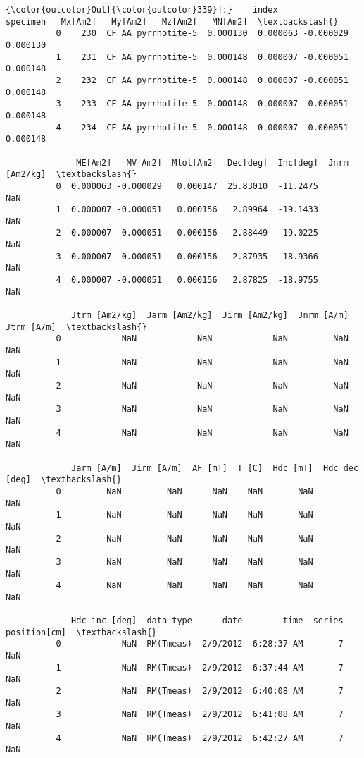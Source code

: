 \documentclass{article}
\begin{document}
            \begin{Verbatim}[commandchars=\\\{\}]
{\color{outcolor}Out[{\color{outcolor}339}]:}    index            specimen   Mx[Am2]   My[Am2]   Mz[Am2]   MN[Am2]  \textbackslash{}
          0    230  CF AA pyrrhotite-5  0.000130  0.000063 -0.000029  0.000130   
          1    231  CF AA pyrrhotite-5  0.000148  0.000007 -0.000051  0.000148   
          2    232  CF AA pyrrhotite-5  0.000148  0.000007 -0.000051  0.000148   
          3    233  CF AA pyrrhotite-5  0.000148  0.000007 -0.000051  0.000148   
          4    234  CF AA pyrrhotite-5  0.000148  0.000007 -0.000051  0.000148   
          
              ME[Am2]   MV[Am2]  Mtot[Am2]  Dec[deg]  Inc[deg]  Jnrm [Am2/kg]  \textbackslash{}
          0  0.000063 -0.000029   0.000147  25.83010  -11.2475            NaN   
          1  0.000007 -0.000051   0.000156   2.89964  -19.1433            NaN   
          2  0.000007 -0.000051   0.000156   2.88449  -19.0225            NaN   
          3  0.000007 -0.000051   0.000156   2.87935  -18.9366            NaN   
          4  0.000007 -0.000051   0.000156   2.87825  -18.9755            NaN   
          
             Jtrm [Am2/kg]  Jarm [Am2/kg]  Jirm [Am2/kg]  Jnrm [A/m]  Jtrm [A/m]  \textbackslash{}
          0            NaN            NaN            NaN         NaN         NaN   
          1            NaN            NaN            NaN         NaN         NaN   
          2            NaN            NaN            NaN         NaN         NaN   
          3            NaN            NaN            NaN         NaN         NaN   
          4            NaN            NaN            NaN         NaN         NaN   
          
             Jarm [A/m]  Jirm [A/m]  AF [mT]  T [C]  Hdc [mT]  Hdc dec [deg]  \textbackslash{}
          0         NaN         NaN      NaN    NaN       NaN            NaN   
          1         NaN         NaN      NaN    NaN       NaN            NaN   
          2         NaN         NaN      NaN    NaN       NaN            NaN   
          3         NaN         NaN      NaN    NaN       NaN            NaN   
          4         NaN         NaN      NaN    NaN       NaN            NaN   
          
             Hdc inc [deg]  data type      date        time  series  position[cm]  \textbackslash{}
          0            NaN  RM(Tmeas)  2/9/2012  6:28:37 AM       7           NaN   
          1            NaN  RM(Tmeas)  2/9/2012  6:37:44 AM       7           NaN   
          2            NaN  RM(Tmeas)  2/9/2012  6:40:08 AM       7           NaN   
          3            NaN  RM(Tmeas)  2/9/2012  6:41:08 AM       7           NaN   
          4            NaN  RM(Tmeas)  2/9/2012  6:42:27 AM       7           NaN   
          

\end{Verbatim}
\end{document}
